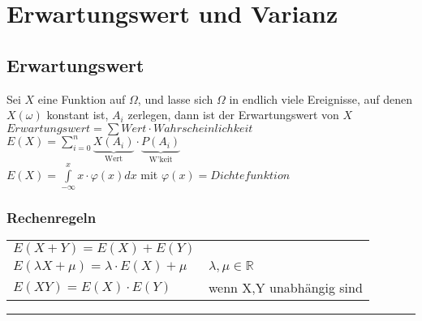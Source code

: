 \section{Erwartungswert und Varianz}

\subsection{Erwartungswert }
Sei $X$ eine Funktion auf $\Omega$, und lasse sich $\Omega$ in endlich viele
Ereignisse, auf denen $X(\omega)$ konstant ist, $A_i$ zerlegen, dann ist der
Erwartungswert von $X$ \\
\hspace*{5.7cm}
$Erwartungswert = \sum Wert \cdot Wahrscheinlichkeit$ \\
\hspace*{7.5cm}
$E(X)=\sum\limits_{i=0}^n \underbrace{X(A_i)}_{\text{Wert}}\cdot
\underbrace{P(A_i)}_{\text{W'keit}}$ \\
\hspace*{5.7cm}
$E(X) = \int\limits_{-\infty}^x x \cdot \varphi(x) dx$ mit $\varphi(x) =
Dichtefunktion$

\subsubsection{Rechenregeln }
\begin{tabular}{ll}
  $E(X+Y)=E(X)+E(Y)$ \\
  $E(\lambda X + \mu) = \lambda \cdot E(X) + \mu$ & $\lambda, \mu \in
  \mathbb{R}$ \\
  $E(XY) = E(X)\cdot E(Y)$ & wenn X,Y unabhängig sind \\
\end{tabular}
\vspace{1mm} %
\hrule       %
\vspace{2mm} %

